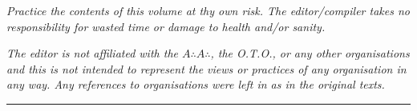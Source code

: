 {\textit{Practice the contents of this volume at thy own risk. The editor/compiler takes no responsibility for wasted time or damage to health and/or sanity.}

\textit{The editor is not affiliated with the $A{\therefore}A{\therefore}$, the O.T.O., or any other organisations and this is not intended to represent the views or practices of any organisation in any way. Any references to organisations were left in as in the original texts.}

\begin{center}
  \rule{1in}{0.5pt}
\end{center}
\vspace*{\fill}
}
